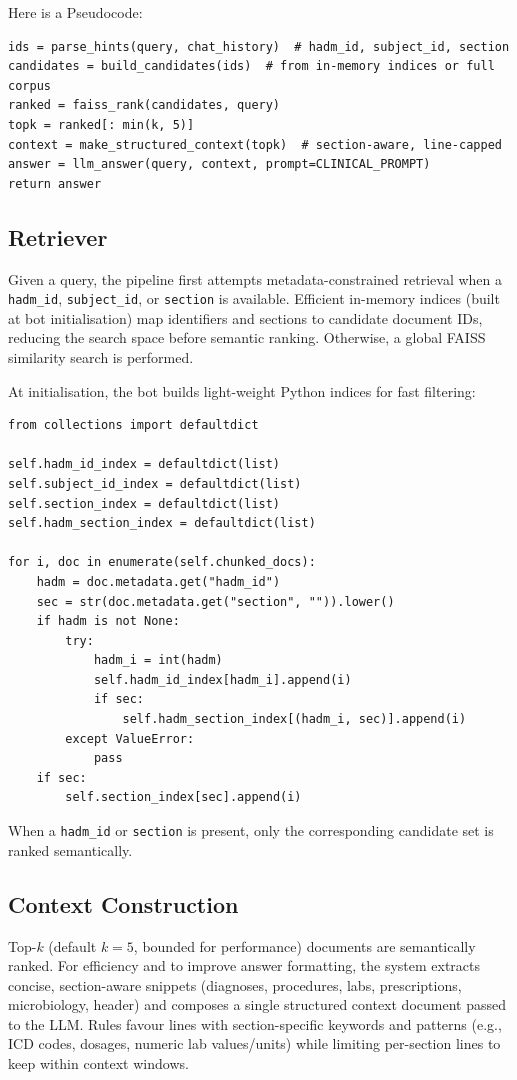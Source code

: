 \noindent Here is a Pseudocode:
\begin{verbatim}
ids = parse_hints(query, chat_history)  # hadm_id, subject_id, section
candidates = build_candidates(ids)  # from in-memory indices or full corpus
ranked = faiss_rank(candidates, query)
topk = ranked[: min(k, 5)]
context = make_structured_context(topk)  # section-aware, line-capped
answer = llm_answer(query, context, prompt=CLINICAL_PROMPT)
return answer
\end{verbatim}

\subsection{Retriever}
Given a query, the pipeline first attempts metadata-constrained retrieval when a \texttt{hadm\_id}, \texttt{subject\_id}, or \texttt{section} is available. Efficient in-memory indices (built at bot initialisation) map identifiers and sections to candidate document IDs, reducing the search space before semantic ranking. Otherwise, a global FAISS similarity search is performed.

\smallskip
\noindent At initialisation, the bot builds light-weight Python indices for fast filtering:
\begin{verbatim}
from collections import defaultdict

self.hadm_id_index = defaultdict(list)
self.subject_id_index = defaultdict(list)
self.section_index = defaultdict(list)
self.hadm_section_index = defaultdict(list)

for i, doc in enumerate(self.chunked_docs):
    hadm = doc.metadata.get("hadm_id")
    sec = str(doc.metadata.get("section", "")).lower()
    if hadm is not None:
        try:
            hadm_i = int(hadm)
            self.hadm_id_index[hadm_i].append(i)
            if sec:
                self.hadm_section_index[(hadm_i, sec)].append(i)
        except ValueError:
            pass
    if sec:
        self.section_index[sec].append(i)
\end{verbatim}

\noindent When a \texttt{hadm\_id} or \texttt{section} is present, only the corresponding candidate set is ranked semantically.

\subsection{Context Construction}
Top-$k$ (default \(k=5\), bounded for performance) documents are semantically ranked. For efficiency and to improve answer formatting, the system extracts concise, section-aware snippets (diagnoses, procedures, labs, prescriptions, microbiology, header) and composes a single structured context document passed to the LLM. Rules favour lines with section-specific keywords and patterns (e.g., ICD codes, dosages, numeric lab values/units) while limiting per-section lines to keep within context windows.

